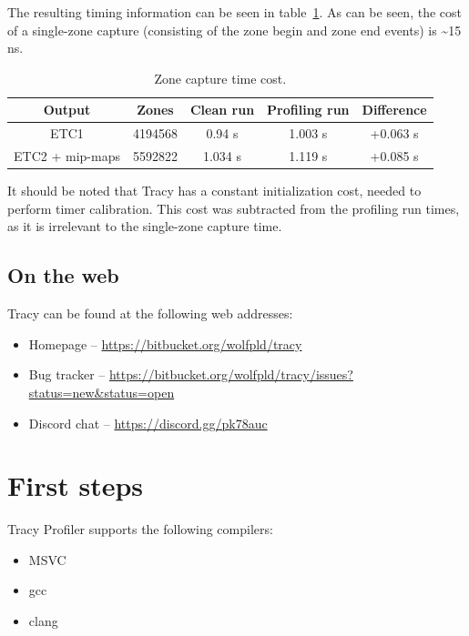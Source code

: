 \documentclass[hidelinks,titlepage,a4paper]{article}
\begin{document}
The resulting timing information can be seen in table~\ref{PerformanceImpact}. As can be seen, the cost of a single-zone capture (consisting of the zone begin and zone end events) is \textasciitilde 15 \si{\nano\second}.

\begin{table}[h]
\centering
\begin{tabular}[h]{c|c|c|c|c}
\textbf{Output} & \textbf{Zones} & \textbf{Clean run} & \textbf{Profiling run} & \textbf{Difference} \\ \hline
ETC1 & \num{4194568} & 0.94 \si{\second} & 1.003 \si{\second} & +0.063 \si{\second} \\
ETC2 + mip-maps & \num{5592822} & 1.034 \si{\second} & 1.119 \si{\second} & +0.085 \si{\second}
\end{tabular}
\caption{Zone capture time cost.}
\label{PerformanceImpact}
\end{table}

It should be noted that Tracy has a constant initialization cost, needed to perform timer calibration. This cost was subtracted from the profiling run times, as it is irrelevant to the single-zone capture time.

\subsection{On the web}

Tracy can be found at the following web addresses:

\begin{itemize}
\item Homepage -- \url{https://bitbucket.org/wolfpld/tracy}
\item Bug tracker -- \url{https://bitbucket.org/wolfpld/tracy/issues?status=new&status=open}
\item Discord chat -- \url{https://discord.gg/pk78auc}
\end{itemize}

\section{First steps}

Tracy Profiler supports the following compilers:

\begin{itemize}
\item MSVC
\item gcc
\item clang
\end{itemize}
\end{document}
